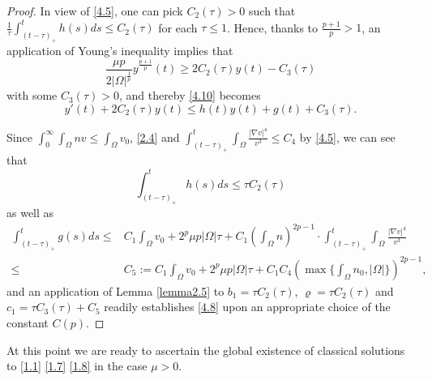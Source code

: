 \documentclass[12pt]{article}
\theoremstyle{plain}
\theoremstyle{definition}
\numberwithin{equation}{section}
\begin{document}
\begin{proof}
In view of \eqref{4.5}, one can pick
$C_2(\tau)>0$ such that
$\frac1 {\tau}\int^t_{(t-\tau)_+}h(s)ds \leq C_2(\tau)$ for each $\tau\leq 1$. Hence,
  thanks to $\frac{p+1}p>1$,  an application of Young's inequality implies that
  $$
 \frac{\mu p}  {2|\Omega|^{\frac1 p}} y^{\frac{p+1}p}(t)\geq 2C_2(\tau) y(t)-C_3(\tau)
  $$
 with some $C_3(\tau)>0$, and thereby \eqref{4.10} becomes
 \begin{equation}\label{4.11}
y'(t)+  2C_2(\tau) y(t)\leq h(t)y(t) +g(t)+C_3(\tau).
\end{equation}

 Since $\int_0^\infty \int_\Omega n v\leq  \int_\Omega v_0$,  \eqref{2.4} and
$ \int^t_{(t-\tau)_+}\int_\Omega \frac{|\nabla v|^4}{v^3}\leq C_4$ by \eqref{4.5}, we can see that
 $$\int^t_{(t-\tau)_+}h(s)ds\leq  \tau C_2(\tau)$$ as well as
 \begin{equation}\label{4.12}
 \begin{split}
 \int^t_{(t-\tau)_+}g(s)ds\leq & C_1 \int_\Omega v_0+ 2^p\mu p|\Omega|\tau+ C_1 \left(\int_\Omega  n\right)^{2p-1}  \cdot  \int^t_{(t-\tau)_+}\int_\Omega \frac{|\nabla v|^4}{v^3}\\
\leq & C_5:=C_1 \int_\Omega v_0+ 2^p\mu p|\Omega|\tau+C_1 C_4 \left(
\max\{\int_\Omega  n_0,|\Omega|\} \right)^{2p-1},
\end{split}
\end{equation}
  and an application of Lemma \ref{lemma2.5} to $b_1= \tau C_2(\tau)$, $\varrho=\tau C_2(\tau)$ and
  $c_1=\tau C_3(\tau)+ C_5$  readily establishes \eqref{4.8} upon an appropriate
choice of the constant $C(p)$.
\end{proof}

At this point we are ready to ascertain the global existence of classical solutions to \eqref{1.1} \eqref{1.7} \eqref{1.8} in the case $\mu>0$.
\end{document}

